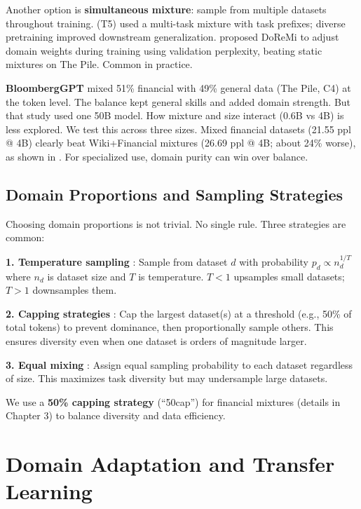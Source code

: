 Another option is \textbf{simultaneous mixture}: sample from multiple datasets throughout training. \textcite{raffel2020exploring} (T5) used a multi-task mixture with task prefixes; diverse pretraining improved downstream generalization. \textcite{xie2023doremi} proposed DoReMi to adjust domain weights during training using validation perplexity, beating static mixtures on The Pile. Common in practice.

\textbf{BloombergGPT} \parencite{wu2023bloomberggpt} mixed 51\% financial with 49\% general data (The Pile, C4) at the token level. The balance kept general skills and added domain strength. But that study used one 50B model. How mixture and size interact (0.6B vs 4B) is less explored. We test this across three sizes. Mixed financial datasets (21.55 ppl @ 4B) clearly beat Wiki+Financial mixtures (26.69 ppl @ 4B; about 24\% worse), as shown in . For specialized use, domain purity can win over balance.

\subsection{Domain Proportions and Sampling Strategies}

Choosing domain proportions is not trivial. No single rule. Three strategies are common:

\textbf{1. Temperature sampling} \parencite{arivazhagan2019massively}: Sample from dataset $d$ with probability $p_d \propto n_d^{1/T}$ where $n_d$ is dataset size and $T$ is temperature. $T < 1$ upsamples small datasets; $T > 1$ downsamples them.

\textbf{2. Capping strategies} \parencite{longpre2023pretrainer}: Cap the largest dataset(s) at a threshold (e.g., 50\% of total tokens) to prevent dominance, then proportionally sample others. This ensures diversity even when one dataset is orders of magnitude larger.

\textbf{3. Equal mixing} \parencite{sanh2022multitask}: Assign equal sampling probability to each dataset regardless of size. This maximizes task diversity but may undersample large datasets.

We use a \textbf{50\% capping strategy} (``50cap'') for financial mixtures (details in Chapter 3) to balance diversity and data efficiency.

\section{Domain Adaptation and Transfer Learning}

